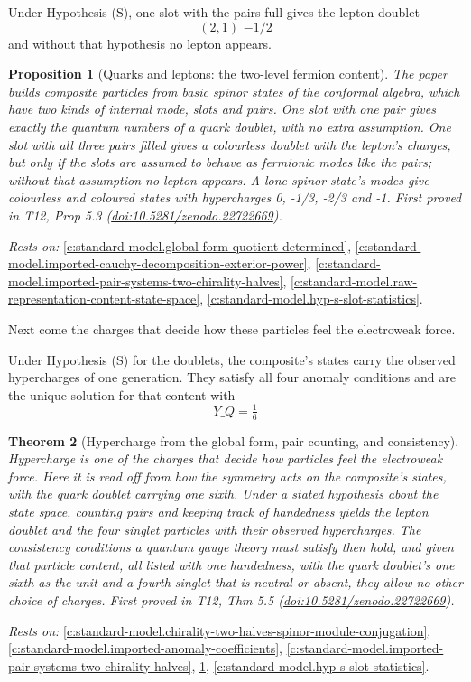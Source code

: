 \documentclass[11pt]{article}
\newtheorem{theorem}{Theorem}[section]
\newtheorem{proposition}[theorem]{Proposition}
\theoremstyle{definition}
\theoremstyle{plain}
\begin{document}
Under Hypothesis (S), one slot with the pairs full gives the lepton doublet \[ (2,1)\_{-1/2} \] and without that hypothesis no lepton appears.

\begin{proposition}[Quarks and leptons: the two-level fermion content]\label{c:standard-model.quarks-leptons-two-level-fermion-content}
The paper builds composite particles from basic spinor states of the conformal algebra, which have two kinds of internal mode, slots and pairs. One slot with one pair gives exactly the quantum numbers of a quark doublet, with no extra assumption. One slot with all three pairs filled gives a colourless doublet with the lepton's charges, but only if the slots are assumed to behave as fermionic modes like the pairs; without that assumption no lepton appears. A lone spinor state's modes give colourless and coloured states with hypercharges 0, -1/3, -2/3 and -1.
\emph{First proved in} T12, Prop 5.3 (\href{https://doi.org/10.5281/zenodo.22722669}{doi:10.5281/zenodo.22722669}).
\end{proposition}
\noindent\emph{Rests on:} \ref{c:standard-model.global-form-quotient-determined}, \ref{c:standard-model.imported-cauchy-decomposition-exterior-power}, \ref{c:standard-model.imported-pair-systems-two-chirality-halves}, \ref{c:standard-model.raw-representation-content-state-space}, \ref{c:standard-model.hyp-s-slot-statistics}.

Next come the charges that decide how these particles feel the electroweak force.

Under Hypothesis (S) for the doublets, the composite's states carry the observed hypercharges of one generation. They satisfy all four anomaly conditions and are the unique solution for that content with \[ Y\_{Q} = \tfrac16 \]

\begin{theorem}[Hypercharge from the global form, pair counting, and consistency]\label{c:standard-model.hypercharge-global-form-pair-counting-consistency}
Hypercharge is one of the charges that decide how particles feel the electroweak force. Here it is read off from how the symmetry acts on the composite's states, with the quark doublet carrying one sixth. Under a stated hypothesis about the state space, counting pairs and keeping track of handedness yields the lepton doublet and the four singlet particles with their observed hypercharges. The consistency conditions a quantum gauge theory must satisfy then hold, and given that particle content, all listed with one handedness, with the quark doublet's one sixth as the unit and a fourth singlet that is neutral or absent, they allow no other choice of charges.
\emph{First proved in} T12, Thm 5.5 (\href{https://doi.org/10.5281/zenodo.22722669}{doi:10.5281/zenodo.22722669}).
\end{theorem}
\noindent\emph{Rests on:} \ref{c:standard-model.chirality-two-halves-spinor-module-conjugation}, \ref{c:standard-model.imported-anomaly-coefficients}, \ref{c:standard-model.imported-pair-systems-two-chirality-halves}, \ref{c:standard-model.quarks-leptons-two-level-fermion-content}, \ref{c:standard-model.hyp-s-slot-statistics}.
\end{document}

